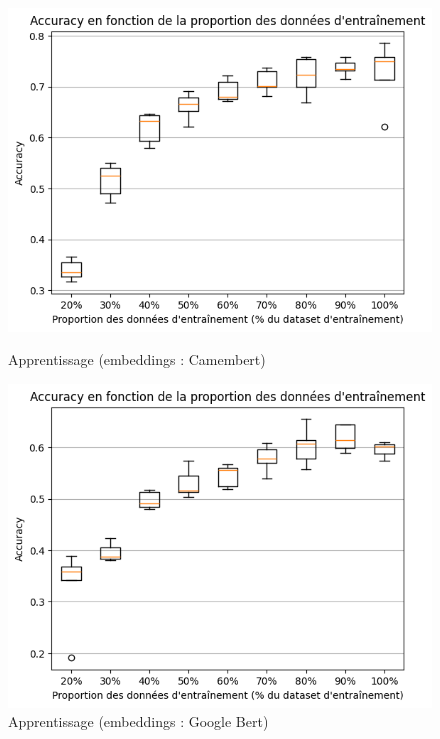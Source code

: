 \documentclass[12pt]{article}
\begin{document}
\begin{figure}[H]
    \centering
    \begin{minipage}[b]{0.45\textwidth}
        \centering
        \includegraphics[width=\textwidth]{static/stat_MLP_cam.png} 
        \caption{Apprentissage (embeddings : Camembert)}
        \label{fig:camenbert}
    \end{minipage}
    \hfill
    \begin{minipage}[b]{0.45\textwidth}
        \centering
        \includegraphics[width=\textwidth]{static/stat_MLP_goo.png} 
        \caption{Apprentissage (embeddings : Google Bert)}
        \label{fig:google_bert}
    \end{minipage}
\end{figure}
\end{document}
